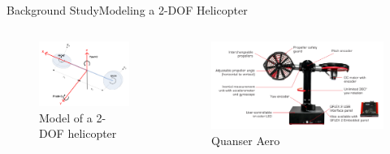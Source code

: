 \documentclass{beamer}
\begin{document}
\begin{frame}{Background Study}{Modeling a 2-DOF Helicopter}
    \begin{columns}
    \begin{figure}
        \centering
        \includegraphics[width=\textwidth]{figs/img/helicopterModel}
        \caption{Model of a 2-DOF helicopter}
        \label{fig:helicopterModel}
    \end{figure}
    \begin{figure}
      \centering 
      \includegraphics[width=\textwidth]{figs/img/QuanserAero}
      \caption{Quanser Aero}
      \label{fig:QuanserAero}
    \end{figure}    
    \end{columns}
\end{frame}
\end{document}
